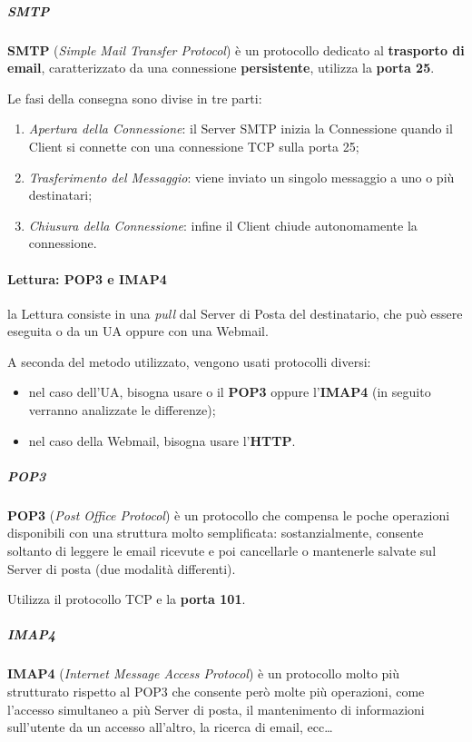 \documentclass[a4paper]{article}
\begin{document}
					\subparagraph{SMTP}
						\textbf{SMTP} (\emph{Simple Mail Transfer Protocol}) è un protocollo dedicato al \textbf{trasporto di email}, caratterizzato da una connessione \textbf{persistente}, utilizza la \textbf{porta 25}.
						
						Le fasi della consegna sono divise in tre parti:
						\begin{enumerate}
							\item \emph{Apertura della Connessione}: il Server SMTP inizia la Connessione quando il Client si connette con una connessione TCP sulla porta 25;
							\item \emph{Trasferimento del Messaggio}: viene inviato un singolo messaggio a uno o più destinatari;
							\item \emph{Chiusura della Connessione}: infine il Client chiude autonomamente la connessione.
						\end{enumerate}
						
						
				\paragraph{Lettura: POP3 e IMAP4}
					la Lettura consiste in una \emph{pull} dal Server di Posta del destinatario, che può essere eseguita o da un UA oppure con una Webmail.
	
					A seconda del metodo utilizzato, vengono usati protocolli diversi:
					\begin{itemize}
						\item nel caso dell'UA, bisogna usare o il \textbf{POP3} oppure l'\textbf{IMAP4} (in seguito verranno analizzate le differenze);
						\item nel caso della Webmail, bisogna usare l'\textbf{HTTP}.
					\end{itemize}
					
					\subparagraph{POP3}
						\textbf{POP3} (\emph{Post Office Protocol}) è un protocollo che compensa le poche operazioni disponibili con una struttura molto semplificata: sostanzialmente, consente soltanto di leggere le email ricevute e poi cancellarle o mantenerle salvate sul Server di posta (due modalità differenti).				
											
						Utilizza il protocollo TCP e la \textbf{porta 101}.
						
					\subparagraph{IMAP4}
						\textbf{IMAP4} (\emph{Internet Message Access Protocol}) è un protocollo molto più strutturato rispetto al POP3 che consente però molte più operazioni, come l'accesso simultaneo a più Server di posta, il mantenimento di informazioni sull'utente da un accesso all'altro, la ricerca di email, ecc\dots 
						
\end{document}
